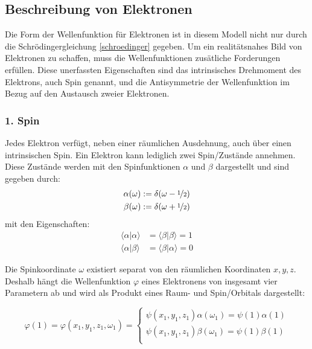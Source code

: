 \subsection{Beschreibung von Elektronen}\label{section_slater}
Die Form der Wellenfunktion für Elektronen ist in diesem Modell nicht nur 
durch die Schrödingergleichung \cref{schroedinger} gegeben.
Um ein realitätsnahes Bild von Elektronen zu schaffen,
muss die Wellenfunktionen zusätliche Forderungen erfüllen.
Diese unerfassten Eigenschaften sind das intrinsisches Drehmoment des Elektrons,
auch Spin genannt, und die Antisymmetrie der Wellenfunktion
im Bezug auf den Austausch zweier Elektronen.

\cite[S. 265, 270]{levine_2019}

\subsubsection*{1. Spin}
Jedes Elektron verfügt, neben einer räumlichen Ausdehnung, 
auch über einen intrinsischen Spin. 
Ein Elektron kann lediglich zwei Spin\-/Zustände annehmen.
Diese Zustände werden mit den Spinfunktionen $\alpha$ und $\beta$ dargestellt und sind gegeben durch:
\begin{equation}\label{spin_function}
  \begin{aligned}
    \alpha(\omega) &:= \delta(\omega - \nicefrac{1}{2})\\
    \beta(\omega) &:= \delta(\omega + \nicefrac{1}{2})
  \end{aligned}
\end{equation}
mit den Eigenschaften:
\begin{equation}\label{spin_product}
  \begin{aligned}
    \langle \alpha \vert \alpha \rangle &= \langle \beta \vert \beta \rangle = 1 \\
    \langle \alpha \vert \beta \rangle &= \langle \beta \vert \alpha \rangle = 0
  \end{aligned}
\end{equation}

Die Spinkoordinate $\omega$ existiert separat von den räumlichen Koordinaten $x,y,z$.
Deshalb hängt die Wellenfunktion $\varphi$ eines Elektronens von insgesamt vier Parametern ab
und wird als Produkt eines Raum- und Spin\-/Orbitals dargestellt:

\begin{equation}\label{spin}
  \varphi(1) = \varphi(x_1, y_1, z_1, \omega_1) = \begin{cases}
    \psi(x_1, y_1, z_1) \alpha(\omega_1) = \psi(1) \alpha(1)\\
    \psi(x_1, y_1, z_1) \beta(\omega_1) = \psi(1) \beta(1)\\
  \end{cases}
\end{equation}

